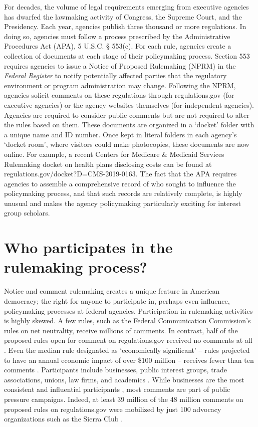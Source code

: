 \documentclass[
      12pt,
        ]{article}
\begin{document}
For decades, the volume of legal requirements emerging from executive
agencies has dwarfed the lawmaking activity of Congress, the Supreme
Court, and the Presidency. Each year, agencies publish three thousand or
more regulations. In doing so, agencies must follow a process prescribed
by the Administrative Procedures Act (APA), 5 U.S.C. § 553(c). For each
rule, agencies create a collection of documents at each stage of their
policymaking process. Section 553 requires agencies to issue a Notice of
Proposed Rulemaking (NPRM) in the \emph{Federal Register} to notify
potentially affected parties that the regulatory environment or program
administration may change. Following the NPRM, agencies solicit comments
on these regulations through regulations.gov (for executive agencies) or
the agency websites themselves (for independent agencies). Agencies are
required to consider public comments but are not required to alter the
rules based on them. These documents are organized in a `docket' folder
with a unique name and ID number. Once kept in literal folders in each
agency's `docket room', where visitors could make photocopies, these
documents are now online. For example, a recent Centers for Medicare \&
Medicaid Services Rulemaking docket on health plans disclosing costs can
be found at regulations.gov/docket?D=CMS-2019-0163. The fact that the
APA requires agencies to assemble a comprehensive record of who sought
to influence the policymaking process, and that such records are
relatively complete, is highly unusual and makes the agency policymaking
particularly exciting for interest group scholars.

\hypertarget{who-participates-in-the-rulemaking-process}{%
\section{Who participates in the rulemaking
process?}\label{who-participates-in-the-rulemaking-process}}

Notice and comment rulemaking creates a unique feature in American
democracy; the right for anyone to participate in, perhaps even
influence, policymaking processes at federal agencies. Participation in
rulemaking activities is highly skewed. A few rules, such as the Federal
Communication Commission's rules on net neutrality, receive millions of
comments. In contrast, half of the proposed rules open for comment on
regulations.gov received no comments at all \citep{LibgoberJOP}. Even
the median rule designated as `economically significant' -- rules
projected to have an annual economic impact of over \$100 million --
receives fewer than ten comments \citep{judgelord2019SPSA}. Participants
include businesses, public interest groups, trade associations, unions,
law firms, and academics \citep{CuellarALR2005, YackeeJOP2006}. While
businesses are the most consistent and influential participants
\citep{YackeeJOP2006, LibgoberJOP}, most comments are part of public
pressure campaigns. Indeed, at least 39 million of the 48 million
comments on proposed rules on regulations.gov were mobilized by just 100
advocacy organizations such as the Sierra Club
\citep{judgelord2019SPSA}.
\end{document}
